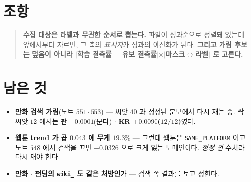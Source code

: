 \documentclass[11pt]{article}
\begin{document}
\section*{조항}

\begin{quote}
\textbf{수집 대상은 라벨과 무관한 순서로 뽑는다.} 파일이 성과순으로
정렬돼 있는데 앞에서부터 자르면, 그 축의 \emph{표시자}가 성과의 이진화가
된다. \textbf{그리고 가림 후보는 덮음이 아니라 $|$학습 결측률 $-$ 유보
결측률$| \times |$마스크$\leftrightarrow$라벨$|$ 로 고른다.}
\end{quote}

\section*{남은 것}

\begin{itemize}
\item \textbf{만화 검색 가림}(노트 $551 \cdot 553$) --- 씨앗 $40$ 과 정정된
분모에서 다시 재는 중. 짝 씨앗 $12$ 에서는 판 $-0.0001$(문다) $\cdot$
\textbf{KR $+0.0090$($12/12$)}였다.
\item \textbf{웹툰 trend 가 곱 $0.043$ 에 무게 $19.3\%$} --- 그런데 웹툰은
\texttt{SAME\_PLATFORM} 이고 노트 $548$ 에서 검색을 끄면 $-0.0326$ 으로 크게
잃는 도메인이다. \emph{정정 전} 수치라 다시 재야 한다.
\item \textbf{만화 $\cdot$ 펀딩의 \texttt{wiki\_} 도 같은 처방인가} ---
검색 쪽 결과를 보고 정한다.
\end{itemize}
\end{document}
